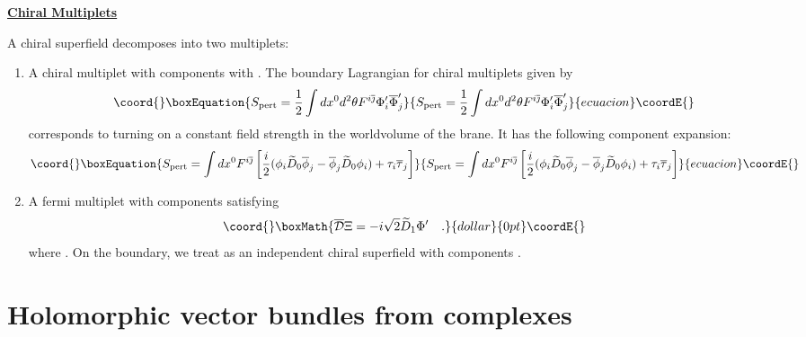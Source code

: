 \documentclass[a4paper,12pt]{article}
\begin{document}
\begin{flushleft}
\underline{\bf {}\coordHE{} Chiral Multiplets}
\end{flushleft}

A \coordHE{} chiral superfield \myHighlight{$\Phi$}\coordHE{} decomposes into two \coordHE{}
multiplets: 
\begin{enumerate}
\item A chiral multiplet \coordHE{} with components \myHighlight{$(\phi,\tau)$}\coordHE{} 
with \coordHE{}. The boundary Lagrangian
for chiral multiplets \coordHE{} given by
\begin{equation}\coord{}\boxEquation{
S_{\rm pert} = {1\over2}\int dx^0 d^2\theta F^{i\overline{\jmath}} 
\Phi'_i \overline{\Phi}'_j
}{
S_{\rm pert} = {1\over2}\int dx^0 d^2\theta F^{i\overline{\jmath}} 
\Phi'_i \overline{\Phi}'_j
}{ecuacion}\coordE{}\end{equation}
corresponds to turning on a constant field strength \coordHE{}
in the worldvolume of the brane. It has the following
component expansion:
\begin{equation}\coord{}\boxEquation{
S_{\rm pert} = \int dx^0  F^{i\overline{\jmath}}
\left[ {i\over2} (\phi_i \widetilde{D}_0 \overline{\phi}_j -
\overline{\phi}_j \widetilde{D}_0 \phi_i) + \tau_i \overline{\tau}_j \right]
}{
S_{\rm pert} = \int dx^0  F^{i\overline{\jmath}}
\left[ {i\over2} (\phi_i \widetilde{D}_0 \overline{\phi}_j -
\overline{\phi}_j \widetilde{D}_0 \phi_i) + \tau_i \overline{\tau}_j \right]
}{ecuacion}\coordE{}\end{equation}
\item A fermi multiplet
\myHighlight{$\Xi$}\coordHE{} with components \coordHE{} satisfying 
$$\coord{}\boxMath{ \overline{\cal D} \Xi =-i\sqrt2 \widetilde{D}_1 \Phi' \quad. }{dollar}{0pt}\coordE{}$$
where \coordHE{}. On the
boundary, we treat \coordHE{} as an independent \coordHE{} chiral
superfield with components \myHighlight{$(\partial_1\phi,\partial_1\tau)$}\coordHE{}.
\end{enumerate}



\section{Holomorphic vector bundles from complexes}
\end{document}
